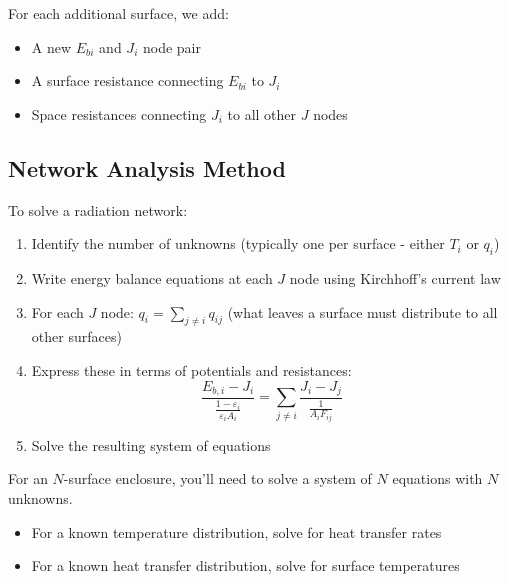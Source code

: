 For each additional surface, we add:
\begin{itemize}
    \item A new $E_{bi}$ and $J_i$ node pair
    \item A surface resistance connecting $E_{bi}$ to $J_i$
    \item Space resistances connecting $J_i$ to all other $J$ nodes
\end{itemize}

\subsection*{Network Analysis Method}

To solve a radiation network:

\begin{enumerate}
    \item Identify the number of unknowns (typically one per surface - either $T_i$ or $q_i$)
    \item Write energy balance equations at each $J$ node using Kirchhoff's current law
    \item For each $J$ node: $q_i = \sum_{j \neq i} q_{ij}$ (what leaves a surface must distribute to all other surfaces)
    \item Express these in terms of potentials and resistances:
    \[
        \frac{E_{b, i}-J_i}{\frac{1-\varepsilon_i}{\varepsilon_i A_i}}= \sum_{j \neq i} \frac{J_i - J_j}{\frac{1}{A_i F_{i j}}}
    \]
    \item Solve the resulting system of equations
\end{enumerate}

For an $N$-surface enclosure, you'll need to solve a system of $N$ equations with $N$ unknowns.

\begin{itemize}
    \item For a known temperature distribution, solve for heat transfer rates
    \item For a known heat transfer distribution, solve for surface temperatures
\end{itemize}
%
